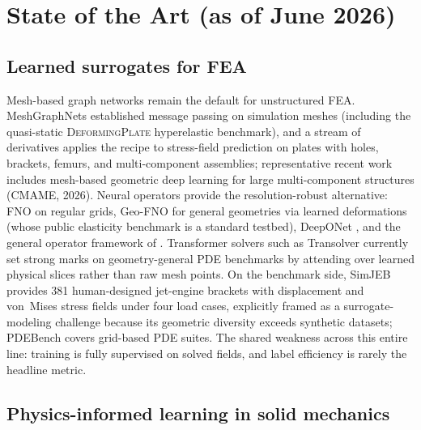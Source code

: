 \documentclass[11pt]{article}
\begin{document}
\section{State of the Art (as of June 2026)}
\label{sec:sota}

\subsection{Learned surrogates for FEA}

Mesh-based graph networks remain the default for unstructured FEA.
MeshGraphNets \cite{pfaff2021} established message passing on simulation
meshes (including the quasi-static \textsc{DeformingPlate} hyperelastic
benchmark), and a stream of derivatives applies the recipe to stress-field
prediction on plates with holes, brackets, femurs, and multi-component
assemblies; representative recent work includes mesh-based geometric deep
learning for large multi-component structures (CMAME, 2026). Neural operators
provide the resolution-robust alternative: FNO \cite{li2021fno} on regular
grids, Geo-FNO \cite{li2023geofno} for general geometries via learned
deformations (whose public elasticity benchmark is a standard testbed),
DeepONet \cite{lu2021deeponet}, and the general operator framework of
\cite{kovachki2023}. Transformer solvers such as Transolver
\cite{wu2024transolver} currently set strong marks on geometry-general PDE
benchmarks by attending over learned physical slices rather than raw mesh
points. On the benchmark side, SimJEB \cite{whalen2021simjeb} provides 381
human-designed jet-engine brackets with displacement and von~Mises stress
fields under four load cases, explicitly framed as a surrogate-modeling
challenge because its geometric diversity exceeds synthetic datasets; PDEBench
\cite{takamoto2022pdebench} covers grid-based PDE suites. The shared weakness
across this entire line: training is fully supervised on solved fields, and
label efficiency is rarely the headline metric.

\subsection{Physics-informed learning in solid mechanics}
\end{document}

